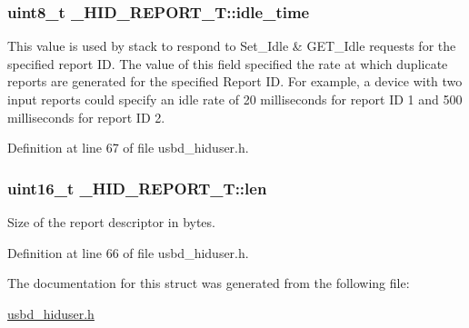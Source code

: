 \subsubsection[{\texorpdfstring{idle\+\_\+time}{idle_time}}]{\setlength{\rightskip}{0pt plus 5cm}uint8\+\_\+t \+\_\+\+H\+I\+D\+\_\+\+R\+E\+P\+O\+R\+T\+\_\+\+T\+::idle\+\_\+time}\hypertarget{struct__HID__REPORT__T_a388e7eacbfc2006e0ada9e81da54760b}{}\label{struct__HID__REPORT__T_a388e7eacbfc2006e0ada9e81da54760b}
This value is used by stack to respond to Set\+\_\+\+Idle \& G\+E\+T\+\_\+\+Idle requests for the specified report ID. The value of this field specified the rate at which duplicate reports are generated for the specified Report ID. For example, a device with two input reports could specify an idle rate of 20 milliseconds for report ID 1 and 500 milliseconds for report ID 2. 

Definition at line 67 of file usbd\+\_\+hiduser.\+h.

\subsubsection[{\texorpdfstring{len}{len}}]{\setlength{\rightskip}{0pt plus 5cm}uint16\+\_\+t \+\_\+\+H\+I\+D\+\_\+\+R\+E\+P\+O\+R\+T\+\_\+\+T\+::len}\hypertarget{struct__HID__REPORT__T_a4c0e68b7360c08788605db4eb667cb4e}{}\label{struct__HID__REPORT__T_a4c0e68b7360c08788605db4eb667cb4e}
Size of the report descriptor in bytes. 

Definition at line 66 of file usbd\+\_\+hiduser.\+h.



The documentation for this struct was generated from the following file\+:\begin{DoxyCompactItemize}
\item 
\hyperlink{usbd__hiduser_8h}{usbd\+\_\+hiduser.\+h}\end{DoxyCompactItemize}
